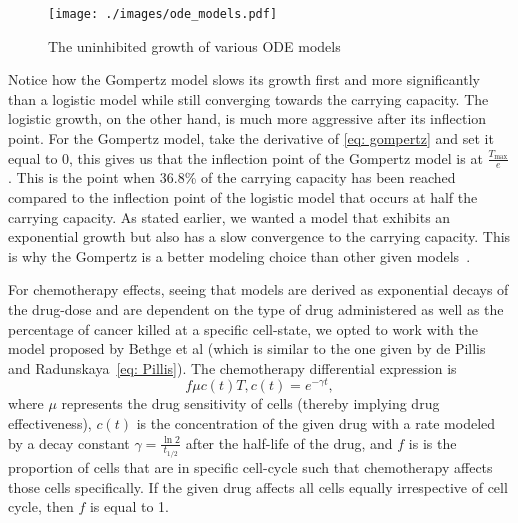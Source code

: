 \documentclass[11pt]{amsart}
\begin{document}
\begin{wrapfigure}[18]{R}{9cm}
  \centering
    \vspace*{-42mm}
    	\begin{varwidth}{\linewidth}
		 \texttt{[image: ./images/ode\_models.pdf]}
		 \captionsetup{justification=centering, width=5cm}
		 \caption{The uninhibited growth of various ODE models}
		 \label{fig:odeModels}
	\end{varwidth}
	\vspace*{-40mm}
\end{wrapfigure}

Notice how the Gompertz model slows its growth first and more significantly than a logistic model while still converging towards the carrying capacity.
The logistic growth, on the other hand, is much more aggressive after its inflection point.
For the Gompertz model, take the derivative of \eqref{eq: gompertz} and set it equal to 0, this gives us that  the inflection point of the Gompertz model is at $\frac{T_{\max}}{e}$.
This is the point when 36.8\% of the carrying capacity has been reached compared to the inflection point of the logistic model that occurs at half the carrying capacity.
As stated earlier, we wanted a model that exhibits an exponential growth but also has a slow convergence to the carrying capacity.
This is why the Gompertz is a better modeling choice than other given models\ \cite{LairdGompertz}. 

For chemotherapy effects, seeing that models are derived as exponential decays of the drug-dose and are dependent on the type of drug administered as well as the percentage of cancer killed at a specific cell-state, we opted to work with the model proposed by Bethge et al (which is similar to the one given by de Pillis and Radunskaya\ \eqref{eq: Pillis}). The chemotherapy differential expression is
\begin{equation}
	f \mu c(t) T, c(t) = e^{-\gamma t} \label{eq: chemo},
\end{equation}
where $\mu$ represents the drug sensitivity of cells (thereby implying drug effectiveness), $c(t)$ is the concentration of the given drug with a rate modeled by a decay constant $\gamma=\frac{\ln{2}}{t_{1/2}}$ after the half-life of the drug, and $f$ is is the proportion of cells that are in specific cell-cycle such that chemotherapy affects those cells specifically.
If the given drug affects all cells equally irrespective of cell cycle, then $f$ is equal to 1.
\end{document}
